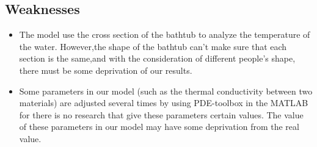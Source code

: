 \documentclass[12pt]{article}
\begin{document}
\subsection{Weaknesses}
\begin{itemize}
    \item The model use the cross section of the bathtub to analyze the temperature of the water.
    However,the shape of the bathtub can't make sure that each section is the same,and with the
    consideration of different people's shape, there must be some deprivation of our results.
    \item Some parameters in our model (such as the thermal conductivity between two materials) are
    adjusted several times by using PDE-toolbox in the MATLAB for there is no research that give
    these parameters certain values. The value of these parameters in our model may have some
    deprivation from the real value.
\end{itemize}
\end{document}
